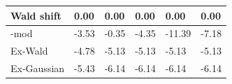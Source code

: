 \begin{tabular}{|l|l|l|l|l|l|}
\hline
Wald shift&0.00&0.00&0.00&0.00&0.00\\\hline
\rocdd{}-mod&-3.53&-0.35&-4.35&-11.39&-7.18\\\hline
Ex-Wald&-4.78&-5.13&-5.13&-5.13&-5.13\\\hline
Ex-Gaussian&-5.43&-6.14&-6.14&-6.14&-6.14\\\hline
\end{tabular}
